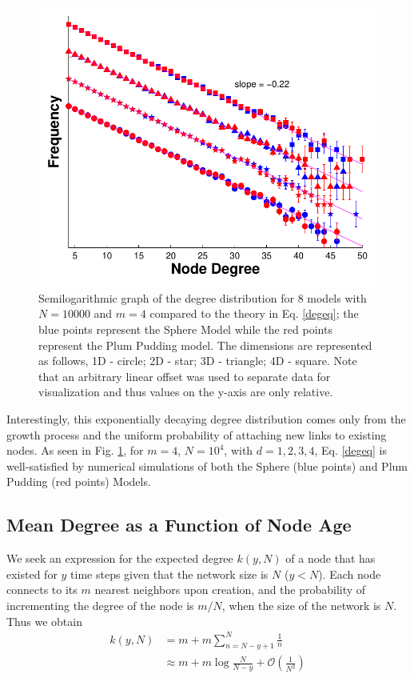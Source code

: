\documentclass[aps,pre,reprint,superscriptaddress,amsmath,amssymb,nofootinbib]{revtex4-1}
\begin{document}
\begin{figure}
\includegraphics[width=\linewidth]{figures/fig11.pdf}
\caption{\label{degdist}Semilogarithmic graph of the degree distribution for 8 models with $N = 10000$ and $m = 4$ compared to the theory in Eq. \eqref{degeq}; the blue points represent the Sphere Model while the red points represent the Plum Pudding model. The dimensions are represented as follows, 1D - circle; 2D - star; 3D - triangle; 4D - square. Note that an arbitrary linear offset was used to separate data for visualization and thus values on the y-axis are only relative.}
\end{figure}
Interestingly, this exponentially decaying degree distribution comes only from the growth process and the uniform probability of attaching new links to existing nodes.  
As seen in Fig. \ref{degdist}, for $m = 4$, $N = 10^4$, with $d = 1,2,3,4$, Eq. \eqref{degeq} is well-satisfied by numerical simulations of both the Sphere (blue points) and Plum Pudding (red points) Models.

\subsection{Mean Degree as a Function of Node Age}
We seek an expression for the expected degree $k(y,N)$ of a node that has existed for $y$ time steps given that the network size is $N$ ($y < N$).
Each node connects to its $m$ nearest neighbors upon creation, and the probability of incrementing the degree of the node is $m/N$, when the size of the network is $N$.
Thus we obtain 
\begin{equation}\label{ageeq}
\begin{split}
k(y,N)& = m + m\sum_{n=N-y+1}^{N} \frac{1}{n}\\
      & \approx m + m \log \frac{N}{N-y} + \mathcal O\left(\frac{1}{N^2}\right)
\end{split}
\end{equation}
 
\end{document}
